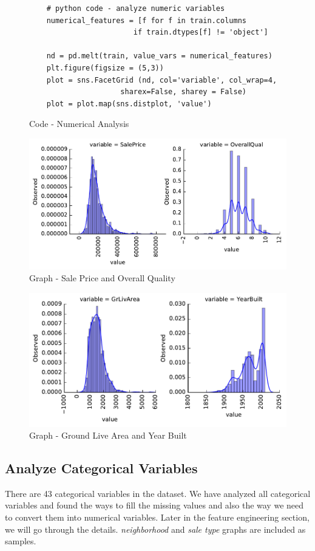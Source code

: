 \documentclass[sigconf]{acmart}
\begin{document}
	\begin{figure}[htb]
	\begin{verbatim}
	# python code - analyze numeric variables
	numerical_features = [f for f in train.columns 
						if train.dtypes[f] != 'object']
	
	nd = pd.melt(train, value_vars = numerical_features)	
	plt.figure(figsize = (5,3))
	plot = sns.FacetGrid (nd, col='variable', col_wrap=4,
	                 sharex=False, sharey = False)
	plot = plot.map(sns.distplot, 'value')				
	\end{verbatim}
	\caption{Code - Numerical Analysis}\label{c:analyze-numeric}
	\end{figure}

	
	\begin{figure}[htb]
		\centering
		\includegraphics[width=0.75\columnwidth]{images/num_features_1}	
		\caption{Graph - Sale Price and Overall Quality}\label{fig:num-feature-1}		
	\end{figure}

	\begin{figure}[htb]
		\centering
		\includegraphics[width=0.75\columnwidth]{images/num_features_2}	
		\caption{Graph - Ground Live Area and Year Built} \label{fig:num_features_2} 
	\end{figure}

	\subsection{Analyze Categorical Variables}
	There are 43 categorical variables in the dataset. We have analyzed all categorical variables and found the ways to fill the missing values and also the way we need to convert them into numerical variables. Later in the feature engineering section, we will go through the details. {\em neighborhood} and {\em sale type} graphs are included as samples.
	
\end{document}
